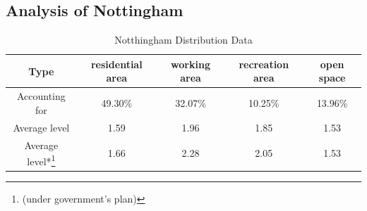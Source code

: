 \subsection{Analysis of Nottingham}
\begin{table}
  \begin{tabular}{c|cccc}
    \hline
    Type & residential area & working area & recreation area & open space \\
    \hline
    Accounting for & 49.30\% & 32.07\% & 10.25\% & 13.96\% \\
    \hline
    Average level & 1.59 & 1.96 & 1.85 & 1.53 \\
    Average level*\footnote{(under government's plan)} & 1.66 & 2.28 & 2.05 & 1.53 \\
    \hline
  \end{tabular}
  \caption{Notthingham Distribution Data}
  \label{tab:nottingham-data}
\end{table}

